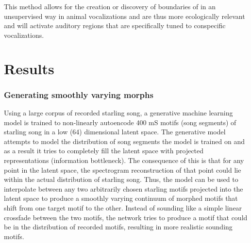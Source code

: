 This method allows for the creation or discovery of boundaries of \CP in an unsupervised way in animal vocalizations and are thus more ecologically relevant and will activate auditory regions that are specifically tuned to conspecific vocalizations.

\section{Results}
\subsubsection{Generating smoothly varying morphs}


Using a large corpus of recorded starling song, a generative machine learning model is trained to non-linearly autoencode 400 mS motifs (song segments) of starling song in a low (64) dimensional latent space. The generative model attempts to model the distribution of song segments the model is trained on and as a result it tries to completely fill the latent space with projected representations (information bottleneck). The consequence of this is that for any point in the latent space, the spectrogram reconstruction of that point could lie within the actual distribution of starling song. Thus, the model can be used to interpolate between any two arbitrarily chosen starling motifs projected into the latent space to produce a smoothly varying continuum of morphed motifs that shift from one target motif to the other. Instead of sounding like a simple linear crossfade between the two motifs, the network tries to produce a motif that could be in the distribution of recorded motifs, resulting in more realistic sounding motifs.

